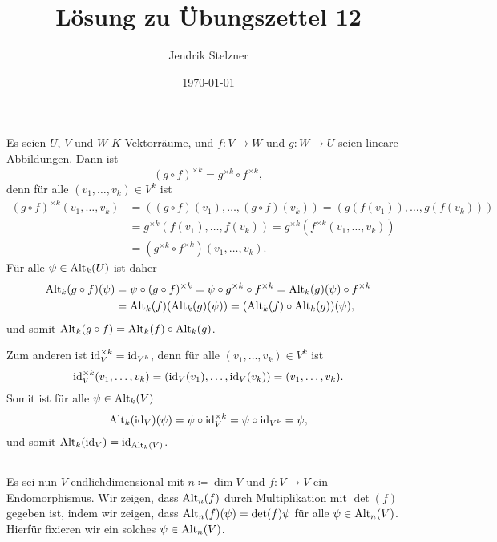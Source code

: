 \documentclass[a4paper,10pt]{article}
\title{Lösung zu Übungszettel 12}
\author{Jendrik Stelzner}
\date{\today}
\begin{document}
\maketitle





\section{}



\subsection{}
Es seien $U$, $V$ und $W$ $K$-Vektorräume, und $f \colon V \to W$ und $g \colon W \to U$ seien lineare Abbildungen. Dann ist
\[
 (g \circ f)^{\times k} = g^{\times k} \circ f^{\times k},
\]
denn für alle $(v_1, \dotsc, v_k) \in V^k$ ist
\begin{align*}
 (g \circ f)^{\times k}(v_1, \dotsc, v_k)
 &= ((g \circ f)(v_1), \dotsc, (g \circ f)(v_k))
 = (g(f(v_1)), \dotsc, g(f(v_k))) \\
 &= g^{\times k}(f(v_1), \dotsc, f(v_k))
 = g^{\times k}( f^{\times k}(v_1, \dotsc, v_k) ) \\
 &= (g^{\times k} \circ f^{\times k})(v_1, \dotsc, v_k).
\end{align*}
Für alle $\psi \in \mathrm{Alt}_k(U)$ ist daher
\begin{align*}
 \mathrm{Alt}_k(g \circ f)(\psi)
 &= \psi \circ (g \circ f)^{\times k}
 = \psi \circ g^{\times k} \circ f^{\times k}
 = \mathrm{Alt}_k(g)(\psi) \circ f^{\times k} \\
 &= \mathrm{Alt}_k(f)( \mathrm{Alt}_k(g)(\psi) )
 = (\mathrm{Alt}_k(f) \circ \mathrm{Alt}_k(g))(\psi),
\end{align*}
und somit $\mathrm{Alt}_k(g \circ f) = \mathrm{Alt}_k(f) \circ \mathrm{Alt}_k(g)$.

Zum anderen ist $\mathrm{id}_V^{\times k} = \mathrm{id}_{V^k}$, denn für alle $(v_1, \dotsc, v_k) \in V^k$ ist
\[
 \mathrm{id}_V^{\times k}(v_1, \dotsc, v_k)
 = (\mathrm{id}_V(v_1), \dotsc, \mathrm{id}_V(v_k))
 = (v_1, \dotsc, v_k).
\]
Somit ist für alle $\psi \in \mathrm{Alt}_k(V)$
\[
 \mathrm{Alt}_k(\mathrm{id}_V)(\psi)
 = \psi \circ \mathrm{id}_V^{\times k}
 = \psi \circ \mathrm{id}_{V^k}
 = \psi,
\]
und somit $\mathrm{Alt}_k(\mathrm{id}_V) = \mathrm{id}_{\mathrm{Alt}_k(V)}$.



\subsection{}
Es sei nun $V$ endlichdimensional mit $n \coloneqq \dim V$ und $f \colon V \to V$ ein Endomorphismus. Wir zeigen, dass $\mathrm{Alt}_n(f)$ durch Multiplikation mit $\det(f)$ gegeben ist, indem wir zeigen, dass $\mathrm{Alt}_n(f)(\psi) = \det(f) \psi$ für alle $\psi \in \mathrm{Alt}_n(V)$. Hierfür fixieren wir ein solches $\psi \in \mathrm{Alt}_n(V)$.
\end{document}
